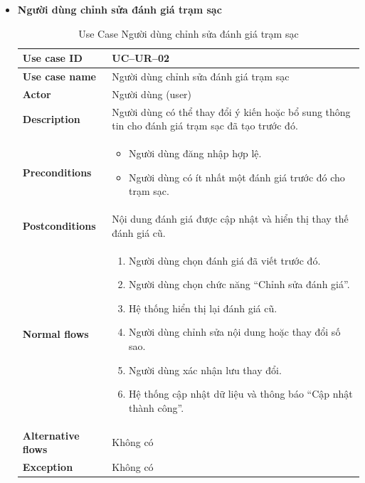 \begin{itemize}
\item \textbf{Người dùng chỉnh sửa đánh giá trạm sạc}
\begin{longtable}{|m{}|m{}|}
          \caption{Use Case Người dùng chỉnh sửa đánh giá trạm sạc} \\
  \hline
  \textbf{Use case ID} & UC--UR--02 \\
  \hline
  \textbf{Use case name} & Người dùng chỉnh sửa đánh giá trạm sạc \\
  \hline
  \textbf{Actor} & Người dùng (user) \\
  \hline
  \textbf{Description} & Người dùng có thể thay đổi ý kiến hoặc bổ sung thông tin cho đánh giá trạm sạc đã tạo trước đó. \\
  \hline
  \textbf{Preconditions} &
  \begin{itemize}
    \item Người dùng đăng nhập hợp lệ.
    \item Người dùng có ít nhất một đánh giá trước đó cho trạm sạc.
  \end{itemize}\\
  \hline
  \textbf{Postconditions} & Nội dung đánh giá được cập nhật và hiển thị thay thế đánh giá cũ. \\
  \hline
  \textbf{Normal flows} &
  \begin{enumerate}[label=\arabic*.]
    \item Người dùng chọn đánh giá đã viết trước đó.
    \item Người dùng chọn chức năng “Chỉnh sửa đánh giá”.
    \item Hệ thống hiển thị lại đánh giá cũ.
    \item Người dùng chỉnh sửa nội dung hoặc thay đổi số sao.
    \item Người dùng xác nhận lưu thay đổi.
    \item Hệ thống cập nhật dữ liệu và thông báo “Cập nhật thành công”.
  \end{enumerate}\\
  \hline
  \textbf{Alternative flows} & Không có\\
  \hline
  \textbf{Exception} & Không có\\
  \hline
  \end{longtable}


\end{itemize}
